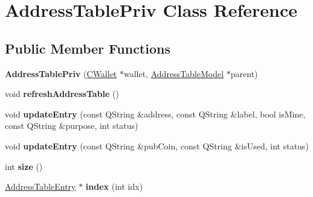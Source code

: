 \hypertarget{class_address_table_priv}{}\section{Address\+Table\+Priv Class Reference}
\label{class_address_table_priv}
\subsection*{Public Member Functions}
\begin{DoxyCompactItemize}
\item 
\mbox{\label{class_address_table_priv_aebe853ef4b33ca8efbca40a7be59d139}} 
{\bfseries Address\+Table\+Priv} (\mbox{\hyperlink{class_c_wallet}{C\+Wallet}} $\ast$wallet, \mbox{\hyperlink{class_address_table_model}{Address\+Table\+Model}} $\ast$parent)
\item 
\mbox{\label{class_address_table_priv_af093c98444e8f734e08cfc2ce5b9b116}} 
void {\bfseries refresh\+Address\+Table} ()
\item 
\mbox{\label{class_address_table_priv_a6f4b10febc3055afde7200c0dbc8ccef}} 
void {\bfseries update\+Entry} (const Q\+String \&address, const Q\+String \&label, bool is\+Mine, const Q\+String \&purpose, int status)
\item 
\mbox{\label{class_address_table_priv_a01a7d8f679bb8350038ac4326db11233}} 
void {\bfseries update\+Entry} (const Q\+String \&pub\+Coin, const Q\+String \&is\+Used, int status)
\item 
\mbox{\label{class_address_table_priv_a4f6133b3bf57ecb5a238698e27a2eb8d}} 
int {\bfseries size} ()
\item 
\mbox{\label{class_address_table_priv_af311eb7d0189a74a508d7ad0f563f307}} 
\mbox{\hyperlink{struct_address_table_entry}{Address\+Table\+Entry}} $\ast$ {\bfseries index} (int idx)
\end{DoxyCompactItemize}
